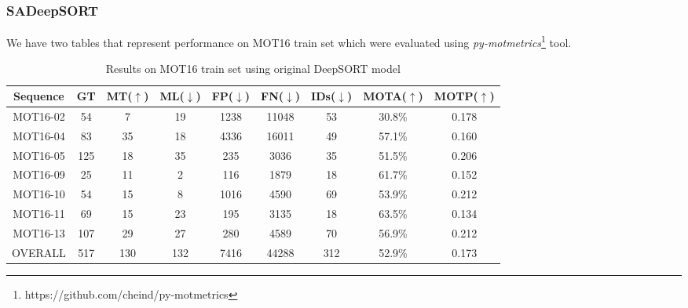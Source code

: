\subsubsection{SADeepSORT}
\hspace{0.5cm}We have two tables that represent performance on MOT16 train set which were evaluated using \textit{py-motmetrics}\footnote{https://github.com/cheind/py-motmetrics} tool. 
\begin{table}[H]
\begin{center}
 \begin{tabular}{||c | c | c | c | c | c | c | c | c ||} 
 \hline
Sequence & GT & MT($\uparrow$)  & ML($\downarrow$) & FP($\downarrow$) & FN($\downarrow$) & IDs($\downarrow$) & MOTA($\uparrow$) & MOTP($\uparrow$) \\
\hline
\hline
MOT16-02 & 54 & 7 &  19 & 1238 & 11048 & 53 & 30.8\% & 0.178 \\
 \hline
MOT16-04 & 83 & 35 &  18 & 4336 & 16011 & 49 & 57.1\% & 0.160\\
\hline
MOT16-05 & 125 & 18 &  35 & 235 & 3036 & 35 & 51.5\% & 0.206 \\
\hline
MOT16-09 & 25 & 11 &   2 & 116 & 1879 & 18 & 61.7\% & 0.152 \\
\hline
MOT16-10 & 54 & 15 &   8 & 1016 & 4590 & 69 & 53.9\% & 0.212 \\
\hline
MOT16-11 &  69 &  15  & 23 & 195 & 3135 & 18 & 63.5\% & 0.134\\
\hline
MOT16-13 & 107 & 29  & 27 & 280 & 4589 & 70 & 56.9\% & 0.212\\
\hline
OVERALL  & 517 & 130  & 132 & 7416 & 44288 & 312 & 52.9\% & 0.173\\

\hline
\end{tabular}
\end{center}
    \caption{Results on MOT16 train set using original DeepSORT model}
    \label{tab:org_result}
\end{table}
